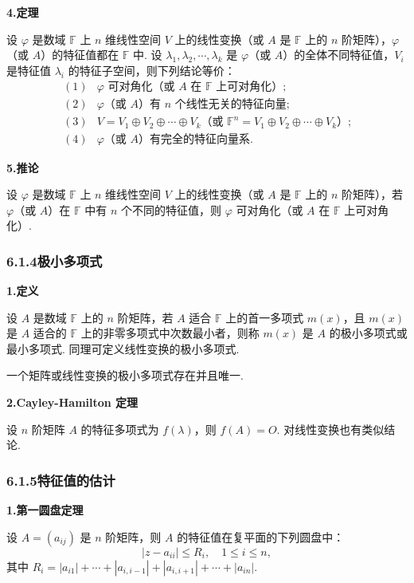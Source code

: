 \documentclass[UTF8,12pt,a4paper,fontset=fandol]{ctexart}
\begin{document}
\noindent\textbf{4.\quad 定理}

设 $\varphi$ 是数域 $\mathbb{F}$ 上 $n$ 维线性空间 $V$ 上的线性变换（或 $A$ 是 $\mathbb{F}$ 上的 $n$ 阶矩阵），$\varphi$（或 $A$）的特征值都在 $\mathbb{F}$ 中. 设 $\lambda_1,\lambda_2,\cdots,\lambda_k$ 是 $\varphi$（或 $A$）的全体不同特征值，$V_i$ 是特征值 $\lambda_i$ 的特征子空间，则下列结论等价：
\[
\begin{array}{ll}
(1) & \varphi\text{ 可对角化（或 }A\text{ 在 }\mathbb{F}\text{ 上可对角化）;}\\
(2) & \varphi\text{（或 }A\text{）有 }n\text{ 个线性无关的特征向量;}\\
(3) & V=V_1\oplus V_2\oplus\cdots\oplus V_k\text{（或 }\mathbb{F}^n=V_1\oplus V_2\oplus\cdots\oplus V_k\text{）;}\\
(4) & \varphi\text{（或 }A\text{）有完全的特征向量系.}
\end{array}
\]

\noindent\textbf{5.\quad 推论}

设 $\varphi$ 是数域 $\mathbb{F}$ 上 $n$ 维线性空间 $V$ 上的线性变换（或 $A$ 是 $\mathbb{F}$ 上的 $n$ 阶矩阵），若 $\varphi$（或 $A$）在 $\mathbb{F}$ 中有 $n$ 个不同的特征值，则 $\varphi$ 可对角化（或 $A$ 在 $\mathbb{F}$ 上可对角化）.

\subsubsection*{6.1.4\quad 极小多项式}

\noindent\textbf{1.\quad 定义}

设 $A$ 是数域 $\mathbb{F}$ 上的 $n$ 阶矩阵，若 $A$ 适合 $\mathbb{F}$ 上的首一多项式 $m(x)$，且 $m(x)$ 是 $A$ 适合的 $\mathbb{F}$ 上的非零多项式中次数最小者，则称 $m(x)$ 是 $A$ 的极小多项式或最小多项式. 同理可定义线性变换的极小多项式.

一个矩阵或线性变换的极小多项式存在并且唯一.

\noindent\textbf{2.\quad Cayley-Hamilton 定理}

设 $n$ 阶矩阵 $A$ 的特征多项式为 $f(\lambda)$，则 $f(A)=O$. 对线性变换也有类似结论.

\subsubsection*{6.1.5\quad 特征值的估计}

\noindent\textbf{1.\quad 第一圆盘定理}

设 $A=(a_{ij})$ 是 $n$ 阶矩阵，则 $A$ 的特征值在复平面的下列圆盘中：
\[
|z-a_{ii}|\le R_i,\quad 1\le i\le n,
\]
其中 $R_i=|a_{i1}|+\cdots+|a_{i,i-1}|+|a_{i,i+1}|+\cdots+|a_{in}|$.
\end{document}
